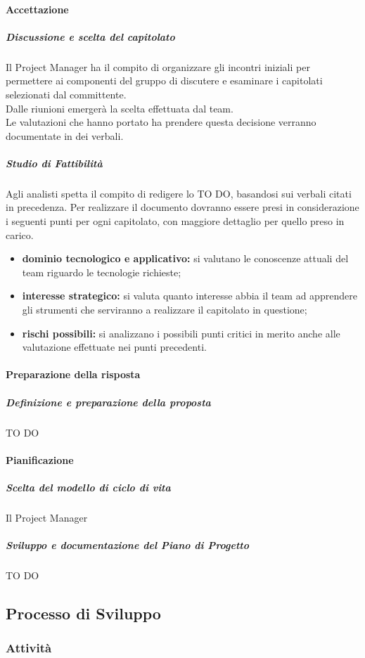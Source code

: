 			\paragraph{Accettazione}
				\subparagraph{Discussione e scelta del capitolato}
Il Project Manager ha il compito di organizzare	gli incontri iniziali per permettere ai componenti del gruppo di discutere e esaminare i capitolati selezionati dal committente. \\
Dalle riunioni emergerà la scelta effettuata dal team. \\
Le valutazioni che hanno portato ha prendere questa decisione verranno documentate in dei verbali.
				\subparagraph{Studio di Fattibilità}
Agli analisti spetta il compito di redigere lo TO DO, basandosi sui verbali citati in precedenza.
Per realizzare il documento dovranno essere presi in considerazione i seguenti punti per ogni capitolato, con maggiore dettaglio per quello preso in carico.
					\begin{itemize}
						\item \textbf{dominio tecnologico e applicativo:} si valutano le conoscenze attuali del team riguardo le tecnologie richieste;
						\item \textbf{interesse strategico:} si valuta quanto interesse abbia il team ad apprendere gli strumenti che serviranno a realizzare il capitolato in questione;
						\item \textbf{rischi possibili:} si analizzano i possibili punti critici in merito anche alle valutazione effettuate nei punti precedenti.
					\end{itemize}
			\paragraph{Preparazione della risposta}
				\subparagraph{Definizione e preparazione della proposta}
TO DO
			
			\paragraph{Pianificazione}
				\subparagraph{Scelta del modello di ciclo di vita}
Il Project Manager
				\subparagraph{Sviluppo e documentazione del Piano di Progetto}
TO DO

				
	\subsection{Processo di Sviluppo}
		\subsubsection{Attività}
